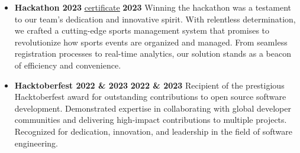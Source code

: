 \documentclass[letterpaper, 11pt]{article}
\newcommand{\secStartSpace}{\vspace{3pt}}
\newcommand{\secEndSpace}{\vspace{5pt}}
\begin{document}
\begin{addmargin}[1em]{1em}
	\begin{itemize}[itemsep=-2.25pt]
		\item \textbf{Hackathon 2023} 
  \href{https://sukhlotey.github.io/imSukhpreet/Images/hackathon.pdf}{\underline{certificate}} \hfill \textbf{2023}
  \newline
    \secStartSpace
  Winning the hackathon was a testament to our team's dedication and innovative spirit. With relentless determination, we crafted a cutting-edge sports management system that promises to revolutionize how sports events are organized and managed. From seamless registration processes to real-time analytics, our solution stands as a beacon of efficiency and convenience.
  \secEndSpace
  
		\item \textbf {Hacktoberfest 2022 \& 2023} \hfill  \textbf{2022 \& 2023}
\newline
\secStartSpace
Recipient of the prestigious Hacktoberfest award for outstanding contributions to open source software development. Demonstrated expertise in collaborating with global developer communities and delivering high-impact contributions to multiple projects. Recognized for dedication, innovation, and leadership in the field of software engineering.
\secEndSpace
  


\end{itemize}
\end{addmargin}
\end{document}
